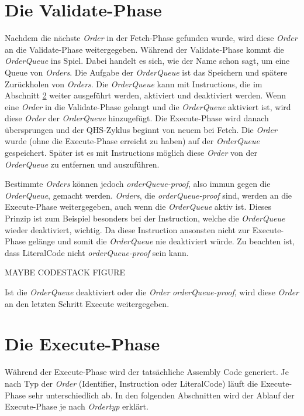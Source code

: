 \section{Die Validate-Phase} \label{sec:qhs-Validate}
Nachdem die nächste \textit{Order} in der  Fetch-Phase gefunden wurde, wird diese \textit{Order} an die Validate-Phase weitergegeben. Während der Validate-Phase kommt die \textit{OrderQueue} ins Spiel.
Dabei handelt es sich, wie der Name schon sagt, um eine Queue von \textit{Orders}.
Die Aufgabe der \textit{OrderQueue} ist das Speichern und spätere Zurückholen von \textit{Orders}. Die \textit{OrderQueue} kann mit Instructions, die im Abschnitt \ref{sec:qhs-execute} weiter ausgeführt werden, aktiviert und deaktiviert werden.
Wenn eine \textit{Order} in die Validate-Phase gelangt und die \textit{OrderQueue} aktiviert ist, wird diese \textit{Order} der \textit{OrderQueue} hinzugefügt.
Die Execute-Phase wird danach übersprungen und der QHS-Zyklus beginnt von neuem bei Fetch.
Die \textit{Order} wurde (ohne die Execute-Phase erreicht zu haben) auf der \textit{OrderQueue} gespeichert. Später ist es mit Instructions möglich diese \textit{Order} von der \textit{OrderQueue} zu entfernen und auszuführen.

Bestimmte \textit{Orders} können jedoch \textit{orderQueue-proof}, also immun gegen die \textit{OrderQueue}, gemacht werden.
\textit{Orders}, die \textit{orderQueue-proof} sind, werden an die Execute-Phase weitergegeben, auch wenn die \textit{OrderQueue} aktiv ist.
Dieses Prinzip ist zum Beispiel besonders bei der Instruction, welche die \textit{OrderQueue} wieder deaktiviert, wichtig.
Da diese Instruction ansonsten nicht zur Execute-Phase gelänge und somit die \textit{OrderQueue} nie deaktiviert würde.
Zu beachten ist, dass LiteralCode nicht \textit{orderQueue-proof} sein kann.

MAYBE CODESTACK FIGURE

Ist die \textit{OrderQueue} deaktiviert oder die \textit{Order} \textit{orderQueue-proof}, wird diese \textit{Order} an den letzten Schritt Execute weitergegeben.

\section{Die Execute-Phase} \label{sec:qhs-execute}
Während der Execute-Phase wird der tatsächliche Assembly Code generiert. Je nach Typ der \textit{Order} (Identifier, Instruction oder LiteralCode) läuft die Execute-Phase sehr unterschiedlich ab.
In den folgenden Abschnitten wird der Ablauf der Execute-Phase je nach \textit{Ordertyp} erklärt.

